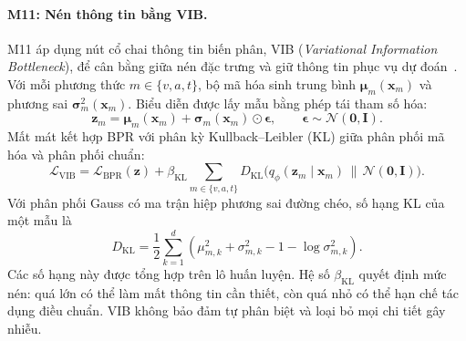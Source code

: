 \paragraph{M11: Nén thông tin bằng VIB.}
M11 áp dụng nút cổ chai thông tin biến phân, VIB (\textit{Variational Information Bottleneck}), để cân bằng giữa nén đặc trưng và giữ thông tin phục vụ dự đoán~\cite{alemi2017vib}. Với mỗi phương thức $m\in\{v,a,t\}$, bộ mã hóa sinh trung bình $\boldsymbol\mu_m(\mathbf x_m)$ và phương sai $\boldsymbol\sigma_m^2(\mathbf x_m)$. Biểu diễn được lấy mẫu bằng phép tái tham số hóa:
\begin{equation}
\mathbf z_m=\boldsymbol\mu_m(\mathbf x_m)+\boldsymbol\sigma_m(\mathbf x_m)\odot\boldsymbol\epsilon,
\qquad \boldsymbol\epsilon\sim\mathcal N(\mathbf0,\mathbf I).
\end{equation}
Mất mát kết hợp BPR với phân kỳ Kullback--Leibler (KL) giữa phân phối mã hóa và phân phối chuẩn:
\begin{equation}
\mathcal L_{\text{VIB}}=\mathcal L_{\text{BPR}}(\mathbf z)+\beta_{\text{KL}}
\sum_{m\in\{v,a,t\}}D_{\text{KL}}\bigl(q_\phi(\mathbf z_m\mid\mathbf x_m)\,\|\,\mathcal N(\mathbf0,\mathbf I)\bigr).
\end{equation}
Với phân phối Gauss có ma trận hiệp phương sai đường chéo, số hạng KL của một mẫu là
\begin{equation}
D_{\text{KL}}=\frac12\sum_{k=1}^{d}\left(\mu_{m,k}^2+\sigma_{m,k}^2-1-\log\sigma_{m,k}^2\right).
\end{equation}
Các số hạng này được tổng hợp trên lô huấn luyện. Hệ số $\beta_{\text{KL}}$ quyết định mức nén: quá lớn có thể làm mất thông tin cần thiết, còn quá nhỏ có thể hạn chế tác dụng điều chuẩn. VIB không bảo đảm tự phân biệt và loại bỏ mọi chi tiết gây nhiễu.

